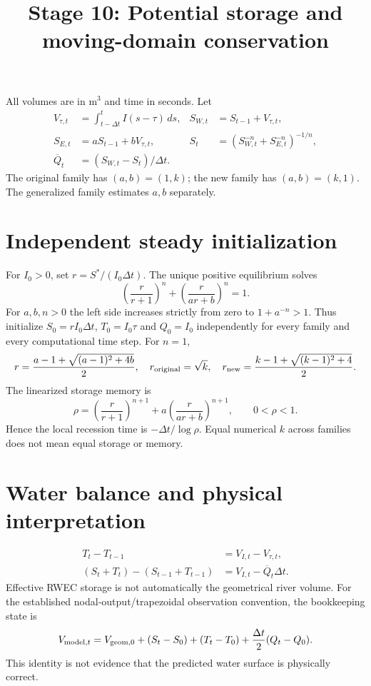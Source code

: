 \documentclass[11pt]{article}
\title{Stage 10: Potential storage and moving-domain conservation}
\date{}
\begin{document}
\maketitle
All volumes are in $\mathrm{m^3}$ and time in seconds. Let
\begin{align}
V_{\tau,t}&=\int_{t-\Delta t}^t I(s-\tau)\,ds, & S_{W,t}&=S_{t-1}+V_{\tau,t},\\
S_{E,t}&=aS_{t-1}+bV_{\tau,t}, & S_t&=(S_{W,t}^{-n}+S_{E,t}^{-n})^{-1/n},\\
\overline Q_t&=(S_{W,t}-S_t)/\Delta t.
\end{align}
The original family has $(a,b)=(1,k)$; the new family has $(a,b)=(k,1)$. The generalized family estimates $a,b$ separately.
\section*{Independent steady initialization}
For $I_0>0$, set $r=S^*/(I_0\Delta t)$. The unique positive equilibrium solves
\begin{equation}
\left(\frac{r}{r+1}\right)^n+\left(\frac{r}{ar+b}\right)^n=1.
\end{equation}
For $a,b,n>0$ the left side increases strictly from zero to $1+a^{-n}>1$. Thus initialize $S_0=rI_0\Delta t$, $T_0=I_0\tau$ and $Q_0=I_0$ independently for every family and every computational time step.
For $n=1$,
\begin{equation}
r=\frac{a-1+\sqrt{(a-1)^2+4b}}{2},\quad r_{\rm original}=\sqrt{k},\quad r_{\rm new}=\frac{k-1+\sqrt{(k-1)^2+4}}{2}.
\end{equation}
The linearized storage memory is
\begin{equation}
\rho=\left(\frac{r}{r+1}\right)^{n+1}+a\left(\frac{r}{ar+b}\right)^{n+1},\qquad 0<\rho<1.
\end{equation}
Hence the local recession time is $-\Delta t/\log\rho$. Equal numerical $k$ across families does not mean equal storage or memory.
\section*{Water balance and physical interpretation}
\begin{align}
T_t-T_{t-1}&=V_{I,t}-V_{\tau,t},\\
(S_t+T_t)-(S_{t-1}+T_{t-1})&=V_{I,t}-\overline Q_t\Delta t.
\end{align}
Effective RWEC storage is not automatically the geometrical river volume. For the established nodal-output/trapezoidal observation convention, the bookkeeping state is
\begin{equation}
V_{{\rm model},t}=V_{{\rm geom},0}+(S_t-S_0)+(T_t-T_0)+\frac{\Delta t}{2}(Q_t-Q_0).
\end{equation}
This identity is not evidence that the predicted water surface is physically correct.
\end{document}
